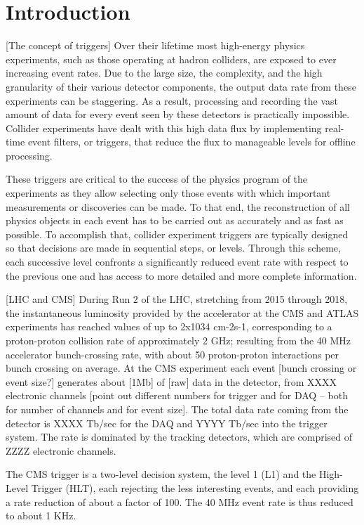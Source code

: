 
\section{Introduction \label{sec:intro}}


[The concept of triggers]
Over their lifetime most high-energy physics experiments, such as those operating at hadron colliders, are exposed to ever increasing event rates. Due to the large size, the complexity, and the high granularity of their various detector components, the output data rate from these experiments can be staggering. As a result, processing and recording the vast amount of data for every event seen by these detectors is practically impossible. Collider experiments have dealt with this high data flux by implementing real-time event filters, or triggers, that reduce the flux to manageable levels for offline processing. 

These triggers are critical to the success of the physics program of the experiments as they allow selecting only those events with which important measurements or discoveries can be made. To that end, the reconstruction of all physics objects in each event has to be carried out as accurately and as fast as possible. To accomplish that, collider experiment triggers are typically designed so that decisions are made in sequential steps, or levels. Through this scheme, each successive level confronts a significantly reduced event rate with respect to the previous one and has access to more detailed and more complete information.

[LHC and CMS]
During Run 2 of the LHC, stretching from 2015 through 2018, the instantaneous luminosity provided by the accelerator at the CMS and ATLAS experiments has reached values of up to 2x1034 cm-2s-1, corresponding to a proton-proton collision rate of approximately 2 GHz; resulting from the 40 MHz accelerator bunch-crossing rate, with about 50 proton-proton interactions per bunch crossing on average.  At the CMS experiment each event [bunch crossing or event size?] generates about [1Mb] of [raw] data in the detector, from XXXX electronic channels [point out different numbers for trigger and for DAQ -- both for number of channels and for event size]. The total data rate coming from the detector is XXXX Tb/sec for the DAQ and YYYY Tb/sec into the trigger system. The rate is dominated by the tracking detectors, which are comprised of ZZZZ electronic channels. 

The CMS trigger is a two-level decision system, the level 1 (L1) and the High-Level Trigger (HLT), each rejecting the less interesting events, and each providing a rate reduction of about a factor of 100. The 40 MHz event rate is thus reduced to about 1 KHz.

